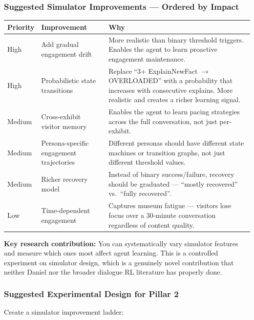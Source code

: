 \documentclass[11pt,a4paper]{article}
\begin{document}
\subsubsection{Suggested Simulator Improvements --- Ordered by Impact}

\begin{table}[h]
\centering
\begin{tabularx}{\textwidth}{l l X}
\toprule
\textbf{Priority} & \textbf{Improvement} & \textbf{Why} \\
\midrule
High & Add gradual engagement drift & More realistic than binary threshold triggers. Enables the agent to learn proactive engagement maintenance. \\
\addlinespace
High & Probabilistic state transitions & Replace ``3+ ExplainNewFact $\rightarrow$ OVERLOADED'' with a probability that increases with consecutive explains. More realistic and creates a richer learning signal. \\
\addlinespace
Medium & Cross-exhibit visitor memory & Enables the agent to learn pacing strategies across the full conversation, not just per-exhibit. \\
\addlinespace
Medium & Persona-specific engagement trajectories & Different personas should have different state machines or transition graphs, not just different threshold values. \\
\addlinespace
Medium & Richer recovery model & Instead of binary success/failure, recovery should be graduated --- ``mostly recovered'' vs.\ ``fully recovered''. \\
\addlinespace
Low & Time-dependent engagement & Captures museum fatigue --- visitors lose focus over a 30-minute conversation regardless of content quality. \\
\bottomrule
\end{tabularx}
\end{table}

\textbf{Key research contribution:} You can systematically vary simulator features and measure which ones most affect agent learning. This is a controlled experiment on simulator design, which is a genuinely novel contribution that neither Daniel nor the broader dialogue RL literature has properly done.

\subsubsection{Suggested Experimental Design for Pillar 2}

Create a simulator improvement ladder:
\end{document}
